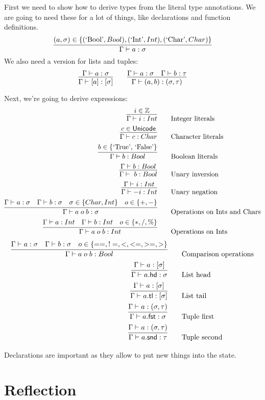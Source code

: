 First we need to show how to derive types from the literal type annotations.
We are going to need these for a lot of things, like declarations and function definitions.
\[
\infer{\Gamma \vdash a : \sigma}{(a, \sigma) \in \{(\mbox{`Bool'}, Bool), (\mbox{`Int'}, Int), (\mbox{`Char'}, Char)\} }
\]
We also need a version for lists and tuples:
\[
\infer{\Gamma \vdash [a] : [\sigma]}{\Gamma \vdash a : \sigma}\qquad
\infer{\Gamma \vdash (a, b) : (\sigma, \tau)}{\Gamma \vdash a : \sigma & \Gamma \vdash b : \tau}
\]

Next, we're going to derive expressions:
\begin{align*}
    \infer{\Gamma \vdash i : Int}{i \in \mathbb{Z}} &\qquad \mbox{Integer literals} \\
    \infer{\Gamma \vdash c : Char}{c \in \mathsf{Unicode}} &\qquad \mbox{Character literals} \\
    \infer{\Gamma \vdash b : Bool}{b \in \{\mbox{`True', `False'}\}} &\qquad \mbox{Boolean literals} \\
    \infer{\Gamma \vdash ~b : Bool}{\Gamma \vdash b : Bool} &\qquad \mbox{Unary inversion}\\
    \infer{\Gamma \vdash -i : Int}{\Gamma \vdash i : Int} &\qquad \mbox{Unary negation}\\
    \infer{\Gamma \vdash a\; o\; b : \sigma}{\Gamma \vdash a : \sigma & \Gamma \vdash b : \sigma & \sigma \in \{Char, Int\} & o \in \{+, -\}} &\qquad \mbox{Operations on Ints and Chars}\\
    \infer{\Gamma \vdash a\; o\; b : Int}{\Gamma \vdash a : Int & \Gamma \vdash b : Int & o \in \{*, /, \% \}} &\qquad \mbox{Operations on Ints}\\
\end{align*}
\begin{align*}
    \infer{\Gamma \vdash a\; o\; b : Bool}{\Gamma \vdash a : \sigma & \Gamma \vdash b : \sigma & o \in \{==, !=, <, <=, >=, >\}} &\qquad \mbox{Comparison operations}\\
    \infer{\Gamma \vdash a\mathsf{.hd} : \sigma}{\Gamma \vdash a : [\sigma]} &\qquad \mbox{List head}\\
    \infer{\Gamma \vdash a\mathsf{.tl} : [\sigma]}{\Gamma \vdash a : [\sigma]} &\qquad \mbox{List tail}\\
    \infer{\Gamma \vdash a\mathsf{.fst} : \sigma}{\Gamma \vdash a : (\sigma, \tau)} &\qquad \mbox{Tuple first}\\
    \infer{\Gamma \vdash a\mathsf{.snd} : \tau}{\Gamma \vdash a : (\sigma, \tau)} &\qquad \mbox{Tuple second}\\
\end{align*}

Declarations are important as they allow to put new things into the state.

\section{Reflection}


